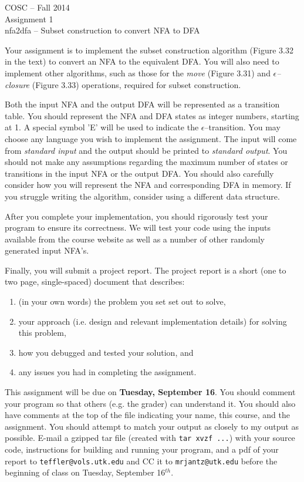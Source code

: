 \documentclass[11pt]{article}
\begin{document}
\begin{center}
  \large{COSC -- Fall 2014 \\
    Assignment 1 \\
    nfa2dfa -- Subset construction to convert NFA to DFA
  }
\end{center}

Your assignment is to implement the subset construction algorithm (Figure
3.32 in the text) to convert an NFA to the equivalent DFA.
You will also need to implement other algorithms, such as those for the
\emph{move} (Figure 3.31) and \emph{$\epsilon$--closure} (Figure 3.33)
operations, required for subset construction.

Both the input NFA and the output DFA will be represented as a transition
table.
You should represent the NFA and DFA states as integer numbers, starting at
1.
A special symbol 'E' will be used to indicate the $\epsilon$--transition.
You may choose any language you wish to implement the assignment.
The input will come from \emph{standard input} and the output should be
printed to \emph{standard output}.
You should not make any assumptions regarding the maximum number of states or
transitions in the input NFA or the output DFA.
You should also carefully consider how you will represent the NFA and
corresponding DFA in memory.
If you struggle writing the algorithm, consider using a different data
structure.

After you complete your implementation, you should rigorously test your
program to ensure its correctness. We will test your code using the inputs
available from the course website as well as a number of other randomly
generated input NFA's.

Finally, you will submit a project report. The project report is a short (one to two
page, single-spaced) document that describes:

\begin{enumerate}
\item (in your own words) the problem you set set out to solve, 
\item your approach (i.e. design and relevant implementation details) for
solving this problem,
\item how you debugged and tested your solution, and 
\item any issues you had in completing the assignment.
\end{enumerate}

This assignment will be due on \textbf{Tuesday, September 16}.
You should comment your program so that others (e.g. the grader) can
understand it. You should also have comments at the top of the file
indicating your name, this course, and the assignment.
You should attempt to match your output as closely to my output as possible.
E-mail a gzipped tar file (created with \texttt{tar xvzf ...}) with your
source code, instructions for building and running your program, and a pdf of
your report to \texttt{teffler@vols.utk.edu} and CC it to
\texttt{mrjantz@utk.edu} before the beginning of class on Tuesday, September
16$^{th}$.
\end{document}
